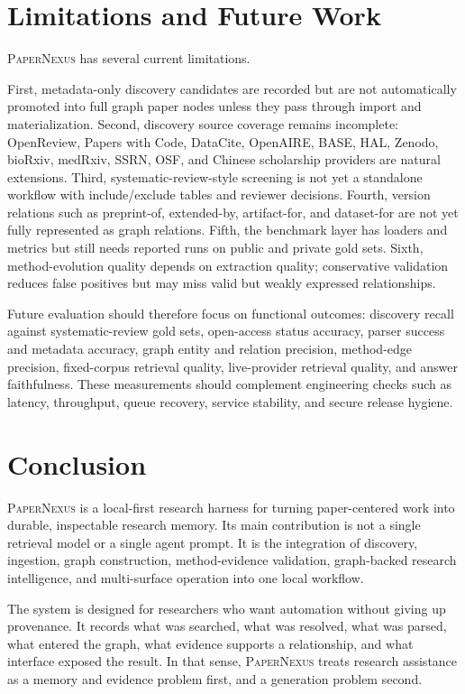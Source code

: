 \documentclass[11pt]{article}
\newcommand{\papernexus}{\textsc{PaperNexus}}
\begin{document}
\section{Limitations and Future Work}

\papernexus{} has several current limitations.

First, metadata-only discovery candidates are recorded but are not automatically promoted into full graph paper nodes unless they pass through import and materialization. Second, discovery source coverage remains incomplete: OpenReview, Papers with Code, DataCite, OpenAIRE, BASE, HAL, Zenodo, bioRxiv, medRxiv, SSRN, OSF, and Chinese scholarship providers are natural extensions. Third, systematic-review-style screening is not yet a standalone workflow with include/exclude tables and reviewer decisions. Fourth, version relations such as preprint-of, extended-by, artifact-for, and dataset-for are not yet fully represented as graph relations. Fifth, the benchmark layer has loaders and metrics but still needs reported runs on public and private gold sets. Sixth, method-evolution quality depends on extraction quality; conservative validation reduces false positives but may miss valid but weakly expressed relationships.

Future evaluation should therefore focus on functional outcomes: discovery recall against systematic-review gold sets, open-access status accuracy, parser success and metadata accuracy, graph entity and relation precision, method-edge precision, fixed-corpus retrieval quality, live-provider retrieval quality, and answer faithfulness. These measurements should complement engineering checks such as latency, throughput, queue recovery, service stability, and secure release hygiene.

\section{Conclusion}

\papernexus{} is a local-first research harness for turning paper-centered work into durable, inspectable research memory. Its main contribution is not a single retrieval model or a single agent prompt. It is the integration of discovery, ingestion, graph construction, method-evidence validation, graph-backed research intelligence, and multi-surface operation into one local workflow.

The system is designed for researchers who want automation without giving up provenance. It records what was searched, what was resolved, what was parsed, what entered the graph, what evidence supports a relationship, and what interface exposed the result. In that sense, \papernexus{} treats research assistance as a memory and evidence problem first, and a generation problem second.
\end{document}
